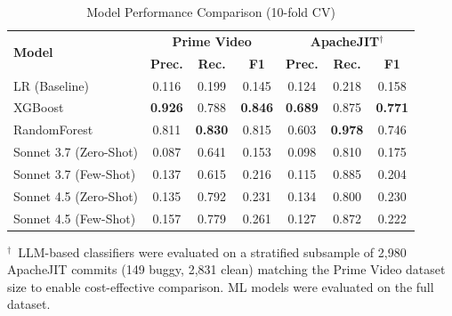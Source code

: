 \begin{table}[h]
\centering
\caption{Model Performance Comparison (10-fold CV)}
\label{tab:model_performance_comparison}
\small
\begin{tabular}{lccc|ccc}
\hline
\multirow{2}{*}{\textbf{Model}} & \multicolumn{3}{c}{\textbf{Prime Video}} & \multicolumn{3}{c}{\textbf{ApacheJIT$^\dagger$}} \\
& \textbf{Prec.} & \textbf{Rec.} & \textbf{F1} & \textbf{Prec.} & \textbf{Rec.} & \textbf{F1} \\
\hline
LR (Baseline) & 0.116 & 0.199 & 0.145 & 0.124 & 0.218 & 0.158 \\
XGBoost & \textbf{0.926} & 0.788 & \textbf{0.846} & \textbf{0.689} & 0.875 & \textbf{0.771} \\
RandomForest & 0.811 & \textbf{0.830} & 0.815 & 0.603 & \textbf{0.978} & 0.746 \\
\hline
Sonnet 3.7 (Zero-Shot) & 0.087 & 0.641 & 0.153 & 0.098 & 0.810 & 0.175 \\
Sonnet 3.7 (Few-Shot) & 0.137 & 0.615 & 0.216 & 0.115 & 0.885 & 0.204 \\
Sonnet 4.5 (Zero-Shot) & 0.135 & 0.792 & 0.231 & 0.134 & 0.800 & 0.230 \\
Sonnet 4.5 (Few-Shot) & 0.157 & 0.779 & 0.261 & 0.127 & 0.872 & 0.222 \\
\hline
\end{tabular}
\vspace{2pt}
\par\noindent\scriptsize
$^\dagger$~LLM-based classifiers were evaluated on a stratified subsample of 2,980 ApacheJIT commits (149 buggy, 2,831 clean) matching the Prime Video dataset size to enable cost-effective comparison. ML models were evaluated on the full dataset.
\end{table}
